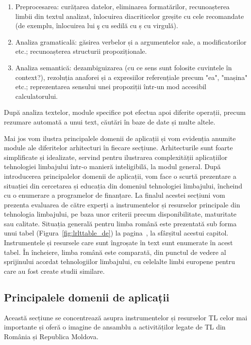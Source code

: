 \begin{multicols}{2}
\begin{enumerate}
\item Preprocesarea: curățarea datelor, eliminarea formatărilor, recunoașterea limbii din textul analizat, înlocuirea diacriticelor greșite cu cele recomandate (de exemplu, înlocuirea lui ş cu sedilă cu ș cu virgulă).
\item Analiza gramaticală: găsirea verbelor și a argumentelor sale, a modificatorilor etc.; recunoașterea structurii propoziționale.
\item Analiza semantică: dezambiguizarea (cu ce sens sunt folosite cuvintele în context?), rezoluția anaforei și a expresiilor referențiale precum "ea", "mașina" etc.; reprezentarea sensului unei propoziții într-un mod accesibil calculatorului.
\end{enumerate}
După analiza textelor, module specifice pot efectua apoi diferite operații, precum rezumare automată a unui text, căutări în baze de date și multe altele. 

Mai jos vom ilustra principalele domenii de aplicații și vom evidenția anumite module ale diferitelor arhitecturi în fiecare secțiune. Arhitecturile sunt foarte simplificate și idealizate, servind pentru ilustrarea complexității aplicațiilor tehnologiei limbajului într-o manieră inteligibilă, la modul general. După introducerea principalelor domenii de aplicații, vom face o scurtă prezentare a situației din cercetarea și educația din domeniul tehnologiei limbajului, încheind cu o enumerare a programelor de finanțare. La finalul acestei secțiuni vom prezenta evaluarea de către experți a instrumentelor și resurselor principale din tehnologia limbajului, pe baza unor criterii precum disponibilitate, maturitate sau calitate. Situația generală pentru limba română este prezentată sub forma unui tabel (Figura~\ref{fig:lrlttable_de}) la pagina~\pageref{fig:lrlttable_de}, la sfârșitul acestui capitol. Instrumentele și resursele care sunt îngroșate în text sunt enumerate în acest tabel. În încheiere, limba română este comparată, din punctul de vedere al sprijinului acordat tehnologiilor limbajului, cu celelalte limbi europene pentru care au fost create studii similare.

\subsection{Principalele domenii de aplicații} 

Această secțiune se concentrează asupra instrumentelor și resurselor TL celor mai importante și oferă o imagine de ansamblu a activităților legate de TL din România și Republica Moldova.

\end{multicols}
